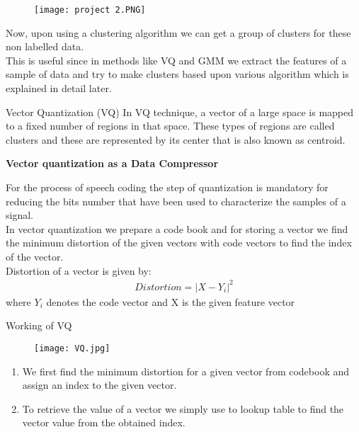 \documentclass{beamer}
\begin{document}
\begin{frame}
\begin{figure}
    \centering
    \texttt{[image: project 2.PNG]}
    
    
\end{figure}
Now, upon using a clustering algorithm we can get a group of clusters for these non labelled data.\\
This is useful since in methods like VQ and GMM we extract the features of a sample of data and try to make clusters based upon various algorithm which is explained in detail later.

\end{frame}
\begin{frame}{Vector Quantization (VQ)}
In VQ technique, a vector of a large space is mapped to a
fixed number of regions in that space. These types of regions
are called clusters and these are represented by its center that is also known as centroid.\\
\begin{block}{}
\textbf{Vector quantization as a Data Compressor}   

For the process of speech coding the step of quantization is
mandatory for reducing the bits number that have been used to
characterize the samples of a signal.\\
In vector quantization we prepare a code book and for storing a vector we find the minimum distortion of the given vectors with code vectors to find the index of the vector. \\
Distortion of a vector is given by:\\
\begin{align}
   Distortion = |X-Y_{i}|^{2}
\end{align}
where $Y_{i}$ denotes the code vector and X is the given feature vector 

\end{block}
\end{frame}
\begin{frame}{Working of VQ  }

\begin{figure}
    \centering
    \texttt{[image: VQ.jpg]}
    
    
\end{figure}
\begin{enumerate}
\item We first find the minimum distortion for a given vector from codebook and assign an index to the given vector.\\
\item To retrieve the value of a vector we simply use to lookup table to find the vector value from the obtained index.\\

\end{enumerate}
\end{frame}
\end{document}
